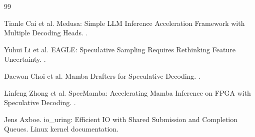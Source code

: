 \documentclass[11pt]{article}
\begin{document}
\begin{thebibliography}{99}

Tianle Cai et al.
\newblock Medusa: Simple LLM Inference Acceleration Framework with Multiple Decoding Heads.
.

Yuhui Li et al.
\newblock EAGLE: Speculative Sampling Requires Rethinking Feature Uncertainty.
.

Daewon Choi et al.
\newblock Mamba Drafters for Speculative Decoding.
.

Linfeng Zhong et al.
\newblock SpecMamba: Accelerating Mamba Inference on FPGA with Speculative Decoding.
.

Jens Axboe.
\newblock io\_uring: Efficient IO with Shared Submission and Completion Queues.
\newblock Linux kernel documentation.

\end{thebibliography}
\end{document}
